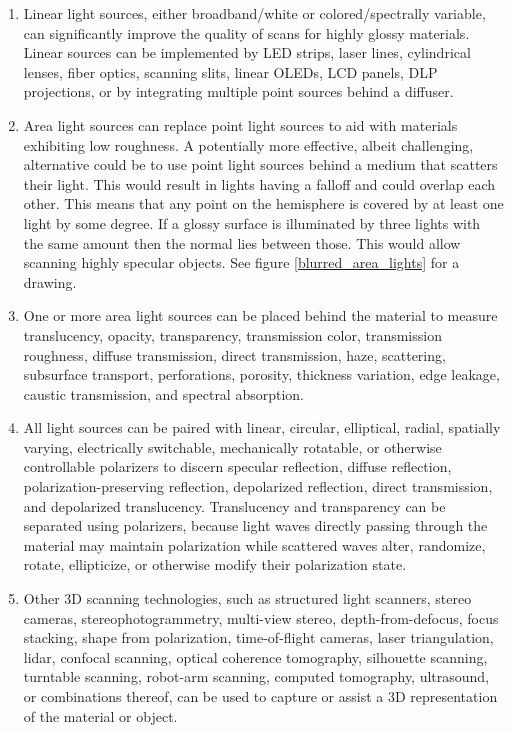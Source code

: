 \documentclass[11pt, twoside, listof=totocnumbered, bibliography=totocnumbered]{scrartcl}
\begin{document}
\begin{enumerate}
		\item Linear light sources, either broadband/white or colored/spectrally variable, can significantly improve the quality of scans for highly glossy materials. \cite{LINEAR_LIGHT} Linear sources can be implemented by LED strips, laser lines, cylindrical lenses, fiber optics, scanning slits, linear OLEDs, LCD panels, DLP projections, or by integrating multiple point sources behind a diffuser.
		
		\item Area light sources can replace point light sources to aid with materials exhibiting low roughness. \cite{PS_AreaLights} A potentially more effective, albeit challenging, alternative could be to use point light sources behind a medium that scatters their light. This would result in lights having a falloff and could overlap each other. This means that any point on the hemisphere is covered by at least one light by some degree. If a glossy surface is illuminated by three lights with the same amount then the normal lies between those. This would allow scanning highly specular objects. See figure \ref{blurred_area_lights} for a drawing.
		
		\item One or more area light sources can be placed behind the material to measure translucency, opacity, transparency, transmission color, transmission roughness, diffuse transmission, direct transmission, haze, scattering, subsurface transport, perforations, porosity, thickness variation, edge leakage, caustic transmission, and spectral absorption.
		
		\item All light sources can be paired with linear, circular, elliptical, radial, spatially varying, electrically switchable, mechanically rotatable, or otherwise controllable polarizers to discern specular reflection, diffuse reflection, polarization-preserving reflection, depolarized reflection, direct transmission, and depolarized translucency. Translucency and transparency can be separated using polarizers, because light waves directly passing through the material may maintain polarization while scattered waves alter, randomize, rotate, ellipticize, or otherwise modify their polarization state.
		
		\item Other 3D scanning technologies, such as structured light scanners, stereo cameras, stereophotogrammetry, multi-view stereo, depth-from-defocus, focus stacking, shape from polarization, time-of-flight cameras, laser triangulation, lidar, confocal scanning, optical coherence tomography, silhouette scanning, turntable scanning, robot-arm scanning, computed tomography, ultrasound, or combinations thereof, can be used to capture or assist a 3D representation of the material or object.
		

\end{enumerate}
\end{document}
